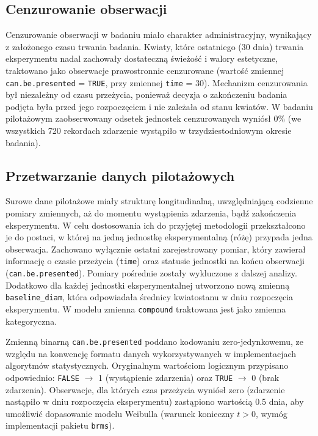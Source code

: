 \documentclass[12pt, a4paper]{article}
\begin{document}
\subsection{Cenzurowanie obserwacji}
Cenzurowanie obserwacji w badaniu miało charakter administracyjny, wynikający z założonego czasu trwania badania. Kwiaty, które ostatniego (30 dnia) trwania eksperymentu nadal zachowały dostateczną świeżość i walory estetyczne, traktowano jako obserwacje prawostronnie cenzurowane (wartość zmiennej \texttt{can.be.presented} = \texttt{TRUE}, przy zmiennej \texttt{time} = 30). Mechanizm cenzurowania był niezależny od czasu przeżycia, ponieważ decyzja o zakończeniu badania podjęta była przed jego rozpoczęciem i nie zależała od stanu kwiatów. W badaniu pilotażowym zaobserwowany odsetek jednostek cenzurowanych wyniósł 0\% (we wszystkich 720 rekordach zdarzenie wystąpiło w trzydziestodniowym okresie badania). 

\subsection{Przetwarzanie danych pilotażowych}\label{sec:pilot_data_processing}
Surowe dane pilotażowe miały strukturę longitudinalną, uwzględniającą codzienne pomiary zmiennych, aż do momentu wystąpienia zdarzenia, bądź zakończenia eksperymentu. W celu dostosowania ich do przyjętej metodologii przekształcono je do postaci, w której na jedną jednostkę eksperymentalną (różę) przypada jedna obserwacja. Zachowano wyłącznie ostatni zarejestrowany pomiar, który zawierał informację o czasie przeżycia (\texttt{time}) oraz statusie jednostki na końcu obserwacji (\texttt{can.be.presented}). Pomiary pośrednie zostały wykluczone z dalszej analizy. Dodatkowo dla każdej jednostki eksperymentalnej utworzono nową zmienną \texttt{baseline\_diam}, która odpowiadała średnicy kwiatostanu w dniu rozpoczęcia eksperymentu. W modelu zmienna \texttt{compound} traktowana jest jako zmienna kategoryczna.

\par Zmienną binarną \texttt{can.be.presented} poddano kodowaniu zero-jedynkowemu, ze względu na konwencję formatu danych wykorzystywanych w implementacjach algorytmów statystycznych. Oryginalnym wartościom logicznym przypisano odpowiednio: \texttt{FALSE} $\rightarrow$ 1 (wystąpienie zdarzenia) oraz \texttt{TRUE} $\rightarrow$ 0 (brak zdarzenia). Obserwacje, dla których czas przeżycia wyniósł zero (zdarzenie nastąpiło w dniu rozpoczęcia eksperymentu) zastąpiono wartością 0.5 dnia, aby umożliwić dopasowanie modelu Weibulla (warunek konieczny $t > 0$, wymóg implementacji pakietu \texttt{brms}).
\end{document}
